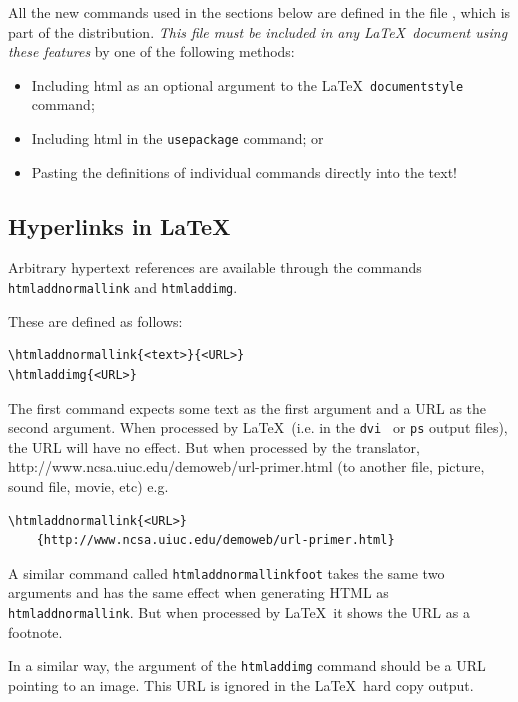 \documentclass[dvips]{article}
\newcommand{\fn}[1]{{\ttfamily #1}}	%
\begin{document}
All the new commands used in the sections 
below are defined in the file \htmladdnormallink{\fn{html.sty}},
which is part of the 
distribution. \emph{This file must be included in any 
\LaTeX\ document using these features} by one of the following methods:

\begin{changebar}
\begin{itemize}
\item Including \fn{html} as an optional argument to the \LaTeX\ 
\texttt{documentstyle} command;
\item Including \fn{html} in the \LaTeXe{} \texttt{usepackage} command; or
\item Pasting the definitions of individual commands
directly into the text!
\end{itemize}
\end{changebar}

\subsection{Hyperlinks in \LaTeX}
\label{sec:hyper}   
Arbitrary hypertext references are available 
through the commands 
\texttt{htmladdnormallink} and \texttt{htmladdimg}.

These are defined as follows:
\begin{verbatim}
\htmladdnormallink{<text>}{<URL>}
\htmladdimg{<URL>}
\end{verbatim}
The first command expects some text as the first argument and a URL as
the second argument. When processed by \LaTeX\  (i.e. in the \texttt{dvi }
or \texttt{ps} output files), the URL will have no effect.
But when processed by the 
translator, 
{http://www.ncsa.uiuc.edu/demoweb/url-primer.html} (to another
file, picture, sound file, movie, etc) e.g.
\begin{verbatim}
\htmladdnormallink{<URL>}
	{http://www.ncsa.uiuc.edu/demoweb/url-primer.html}
\end{verbatim}

A similar command called \texttt{htmladdnormallinkfoot} 
takes the same two arguments and has the same effect when generating
HTML as \texttt{htmladdnormallink}. But when processed by \LaTeX\  it shows
the 
URL as a footnote.

In a similar way, the argument of the \texttt{htmladdimg} command 
should be a URL pointing to an image.  This URL is ignored in
the \LaTeX\  hard copy output. 
\end{document}
